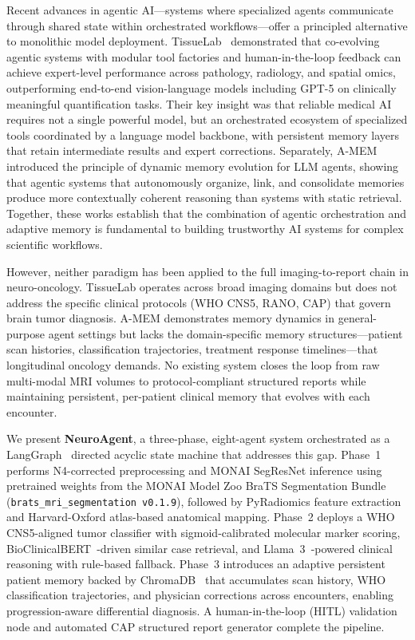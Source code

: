 Recent advances in agentic AI---systems where specialized agents communicate through shared state within orchestrated workflows---offer a principled alternative to monolithic model deployment. TissueLab~\cite{tissuelab2025} demonstrated that co-evolving agentic systems with modular tool factories and human-in-the-loop feedback can achieve expert-level performance across pathology, radiology, and spatial omics, outperforming end-to-end vision-language models including GPT-5 on clinically meaningful quantification tasks. Their key insight was that reliable medical AI requires not a single powerful model, but an orchestrated ecosystem of specialized tools coordinated by a language model backbone, with persistent memory layers that retain intermediate results and expert corrections. Separately, A-MEM~\cite{amem2024} introduced the principle of dynamic memory evolution for LLM agents, showing that agentic systems that autonomously organize, link, and consolidate memories produce more contextually coherent reasoning than systems with static retrieval. Together, these works establish that the combination of agentic orchestration and adaptive memory is fundamental to building trustworthy AI systems for complex scientific workflows.

However, neither paradigm has been applied to the full imaging-to-report chain in neuro-oncology. TissueLab operates across broad imaging domains but does not address the specific clinical protocols (WHO CNS5, RANO, CAP) that govern brain tumor diagnosis. A-MEM demonstrates memory dynamics in general-purpose agent settings but lacks the domain-specific memory structures---patient scan histories, classification trajectories, treatment response timelines---that longitudinal oncology demands. No existing system closes the loop from raw multi-modal MRI volumes to protocol-compliant structured reports while maintaining persistent, per-patient clinical memory that evolves with each encounter.

We present \textbf{NeuroAgent}, a three-phase, eight-agent system orchestrated as a LangGraph~\cite{langgraph2024} directed acyclic state machine that addresses this gap. Phase~1 performs N4-corrected preprocessing and MONAI SegResNet inference using pretrained weights from the MONAI Model Zoo BraTS Segmentation Bundle (\texttt{brats\_mri\_segmentation v0.1.9}), followed by PyRadiomics feature extraction and Harvard-Oxford atlas-based anatomical mapping. Phase~2 deploys a WHO CNS5-aligned tumor classifier with sigmoid-calibrated molecular marker scoring, BioClinicalBERT~\cite{alsentzer2019clinical}-driven similar case retrieval, and Llama~3~\cite{llama3}-powered clinical reasoning with rule-based fallback. Phase~3 introduces an adaptive persistent patient memory backed by ChromaDB~\cite{chromadb2024} that accumulates scan history, WHO classification trajectories, and physician corrections across encounters, enabling progression-aware differential diagnosis. A human-in-the-loop (HITL) validation node and automated CAP structured report generator complete the pipeline.

